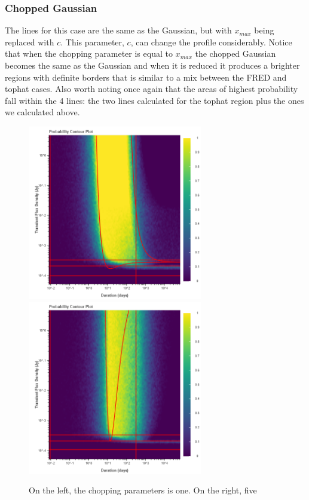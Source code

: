 \documentclass{article}
\begin{document}
\subsubsection{Chopped Gaussian}
The lines for this case are the same as the Gaussian, but with $x_{max}$ being replaced with $c$. This parameter, $c$, can change the profile considerably. Notice that when the chopping parameter is equal to $x_{max}$ the chopped Gaussian becomes the same as the Gaussian and when it is reduced it produces a brighter regions with definite borders that is similar to a mix between the FRED and tophat cases. Also worth noting once again that the areas of highest probability fall within the 4 lines: the two lines calculated for the tophat region plus the ones we calculated above. 
\begin{figure}[htp] 
	\centering
		\includegraphics[width=3in]{output_choppedgaussian_ProbContour1.png}
		\includegraphics[width=3in]{output_choppedgaussian_ProbContour5.png}
		\label{choppedgaussian}
		\caption{On the left, the chopping parameters is one. On the right, five}

\end{figure}
\end{document}
